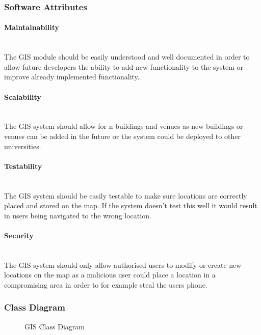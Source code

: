 \subsubsection{Software Attributes}
	
\paragraph{Maintainability}
\mbox{}\\
The GIS module should be easily understood and well documented in order to allow future developers the ability to add new functionality to the system or improve already implemented functionality.

\paragraph{Scalability}
\mbox{}\\
The GIS system should allow for n buildings and venues as new buildings or venues can be added in the future or the system could be deployed to other universities.

\paragraph{Testability}
\mbox{}\\
The GIS system should be easily testable to make sure locations are correctly placed and stored on the map. If the system doesn't test this well it would result in users being navigated to the wrong location.

\paragraph{Security}
\mbox{}\\
The GIS system should only allow authorised users to modify or create new locations on the map as a malicious user could place a location in a compromising area in order to for example steal the users phone.
 

\subsubsection{Class Diagram}

	\begin{figure}[h!]


\caption{GIS Class Diagram}

	\end{figure}